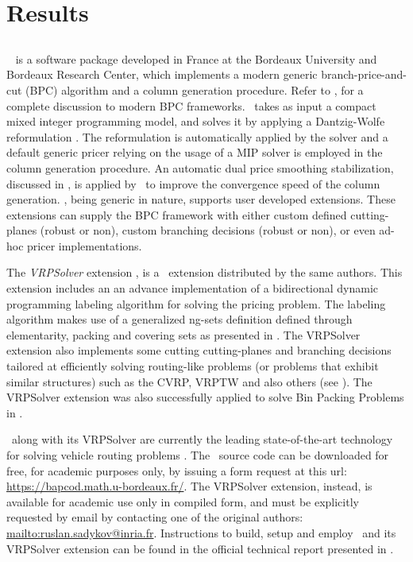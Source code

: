 \chapter{Results}
\label{sec:results}

\section{\bapcod}
\label{sec:results-bapcod}

\textit{\bapcod}\ \parencite{sadykov2021} is a software package
developed in France at the Bordeaux University and Bordeaux Research Center,
which implements a modern generic branch-price-and-cut (BPC) algorithm
and a column generation procedure.
Refer to \textcite{sadykov2019b}, for a complete discussion to modern BPC frameworks.
\bapcod\ takes as input a compact mixed integer programming model,
and solves it by applying a Dantzig-Wolfe reformulation \parencite{dantzig1960}.
The reformulation is automatically applied by the solver
and a default generic pricer relying on
the usage of a MIP solver is employed in the column generation procedure.
An automatic dual price smoothing stabilization, discussed in \textcite{pessoa2018automation},
is applied by \bapcod\ to improve the convergence speed of the column generation.
\bapcod, being generic in nature,
supports user developed extensions.
These extensions can supply the BPC framework with either
custom defined cutting-planes (robust or non), custom branching decisions (robust or non),
or even ad-hoc pricer implementations.

The \textit{VRPSolver} extension \parencite{pessoa2020a}, is
a \bapcod\ extension distributed by the same authors.
This extension includes an
an advance implementation of a bidirectional dynamic programming labeling algorithm
\parencite{sadykov2021a} for solving the pricing problem.
The labeling algorithm makes use of a generalized ng-sets definition \parencite{baldacci2011}
defined through elementarity, packing and covering sets as presented in \textcite{pessoa2020a}.
The VRPSolver extension also implements
some cutting cutting-planes and branching decisions
tailored at efficiently solving routing-like problems
(or problems that exhibit similar structures)
such as the CVRP, VRPTW and also others (see \cite{pessoa2020a}).
The VRPSolver extension was also successfully applied
to solve Bin Packing Problems in \textcite{pessoa2020}.

\bapcod\ along with its VRPSolver are currently the leading state-of-the-art
technology for solving vehicle routing problems \parencite{pessoa2020a}.
The \bapcod\ source code can be downloaded for free, for academic purposes only,
by issuing a form request at this url: \url{https://bapcod.math.u-bordeaux.fr/}.
The VRPSolver extension, instead, is available for academic use only in compiled form,
and must be explicitly requested by email by contacting one of the
original authors: \url{mailto:ruslan.sadykov@inria.fr}.
Instructions to build, setup and employ \bapcod\ and its VRPSolver extension
can be found in the official technical report presented in \textcite{sadykov2021}.

